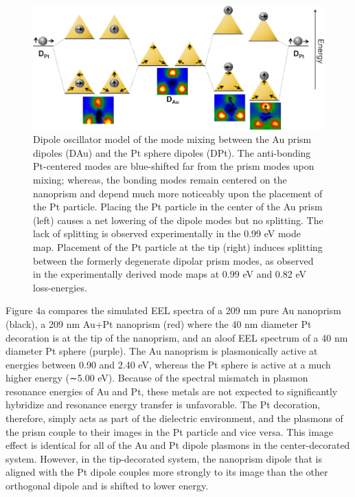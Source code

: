 \documentclass [11pt, proquest] {uwthesis}[2016/11/22]
\begin{document}
\begin{figure}
\begin{centering}
\includegraphics{prisms_theory.png}
\caption{Dipole oscillator model of the mode mixing between the Au prism dipoles (DAu) and the Pt sphere dipoles (DPt). The anti-bonding Pt-centered modes are blue-shifted far from the prism modes upon mixing; whereas, the bonding modes remain centered on the nanoprism and depend much more noticeably upon the placement of the Pt particle. Placing the Pt particle in the center of the Au prism (left) causes a net lowering of the dipole modes but no splitting. The lack of splitting is observed experimentally in the 0.99 eV mode map. Placement of the Pt particle at the tip (right) induces splitting between the formerly degenerate dipolar prism modes, as observed in the experimentally derived mode maps at 0.99 eV and 0.82 eV loss-energies.}
\label{mo_diagram}
\end{centering}
\end{figure}

Figure 4a compares the simulated EEL spectra of a 209 nm pure Au nanoprism (black), a 209 nm Au+Pt nanoprism (red) where the 40 nm diameter Pt decoration is at the tip of the nanoprism, and an aloof EEL spectrum of a 40 nm diameter Pt sphere (purple). The Au nanoprism is plasmonically active at energies between 0.90 and 2.40 eV, whereas the Pt sphere is active at a much higher energy (∼5.00 eV). Because of the spectral mismatch in plasmon resonance energies of Au and Pt, these metals are not expected to significantly hybridize and resonance energy transfer is unfavorable. The Pt decoration, therefore, simply acts as part of the dielectric environment, and the plasmons of the prism couple to their images in the Pt particle and vice versa. This image effect is identical for all of the Au and Pt dipole plasmons in the center-decorated system. However, in the tip-decorated system, the nanoprism dipole that is aligned with the Pt dipole couples more strongly to its image than the other orthogonal dipole and is shifted to lower energy.
\end{document}
